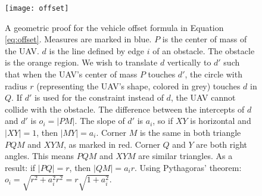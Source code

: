 \begin{figure}
    \centering
        \texttt{[image: offset]}
    \caption[A geometric proof for Equation \ref{eq:offset}]{A geometric proof for the vehicle offset formula in Equation \ref{eq:offset}. Measures are marked in blue. $P$ is the center of mass of the UAV. $d$ is the line defined by edge $i$ of an obstacle. The obstacle is the orange region. We wish to translate $d$ vertically to $d'$ such that when the UAV's center of mass $P$ touches $d'$, the circle with radius $r$ (representing the UAV's shape, colored in grey) touches $d$ in $Q$. If $d'$ is used for the constraint instead of $d$, the UAV cannot collide with the obstacle. The difference between the intercepts of $d$ and $d'$ is $o_i = |PM|$. The slope of $d'$ is $a_i$, so if $XY$ is horizontal and $|XY| = 1$, then $|MY| = a_i$. Corner $M$ is the same in both triangle $PQM$ and $XYM$, as marked in red. Corner $Q$ and $Y$ are both right angles. This means $PQM$ and $XYM$ are similar triangles. As a result: if $|PQ| = r$, then $|QM| = a_ir$. Using Pythagoras' theorem: $o_i = \sqrt{r^2 + a_i^2r^2} = r\sqrt{1+a_i^2}$.}\label{fig:offset-proof}
\end{figure}